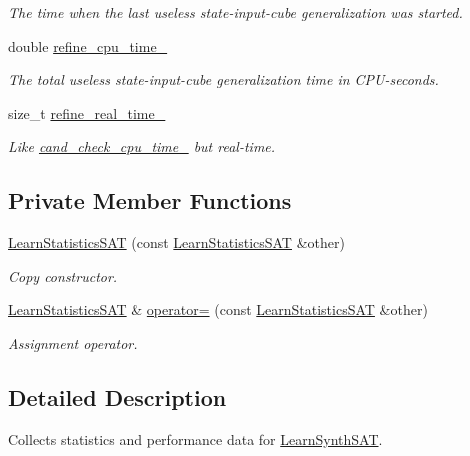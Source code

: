\begin{DoxyCompactItemize}
\begin{DoxyCompactList}\small\item\em The time when the last useless state-\/input-\/cube generalization was started. \end{DoxyCompactList}\item 
double \hyperlink{classLearnStatisticsSAT_ad50f0623e605d349f3221f9e1332805d}{refine\-\_\-cpu\-\_\-time\-\_\-}
\begin{DoxyCompactList}\small\item\em The total useless state-\/input-\/cube generalization time in C\-P\-U-\/seconds. \end{DoxyCompactList}\item 
size\-\_\-t \hyperlink{classLearnStatisticsSAT_aa36efa6b1b2bfef8ca65095952c5c35e}{refine\-\_\-real\-\_\-time\-\_\-}
\begin{DoxyCompactList}\small\item\em Like \hyperlink{classLearnStatisticsSAT_a2ab5cd522b7a4d700a11c0bb430baa81}{cand\-\_\-check\-\_\-cpu\-\_\-time\-\_\-} but real-\/time. \end{DoxyCompactList}\end{DoxyCompactItemize}
\subsection*{Private Member Functions}
\begin{DoxyCompactItemize}
\item 
\hyperlink{classLearnStatisticsSAT_a7742a608e500e2b15a9a73b09653f4d7}{Learn\-Statistics\-S\-A\-T} (const \hyperlink{classLearnStatisticsSAT}{Learn\-Statistics\-S\-A\-T} \&other)
\begin{DoxyCompactList}\small\item\em Copy constructor. \end{DoxyCompactList}\item 
\hyperlink{classLearnStatisticsSAT}{Learn\-Statistics\-S\-A\-T} \& \hyperlink{classLearnStatisticsSAT_affa4808714ffa665d57a49993cdca5ec}{operator=} (const \hyperlink{classLearnStatisticsSAT}{Learn\-Statistics\-S\-A\-T} \&other)
\begin{DoxyCompactList}\small\item\em Assignment operator. \end{DoxyCompactList}\end{DoxyCompactItemize}


\subsection{Detailed Description}
Collects statistics and performance data for \hyperlink{classLearnSynthSAT}{Learn\-Synth\-S\-A\-T}. 

